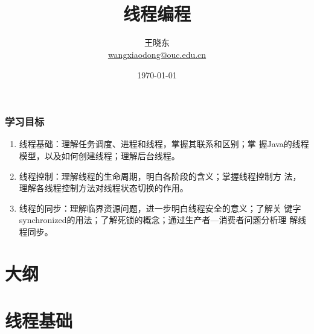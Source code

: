 
\title[KevinW@OUC]{\\  
  线程编程}
\author[王晓东]{王晓东\\
  \href{mailto:wangxiaodong@ouc.edu.cn}{\footnotesize wangxiaodong@ouc.edu.cn}}
\date{\today}


\frame{\titlepage}
\begin{frame}
  \frametitle{学习目标}
  \begin{enumerate}
  \item 线程基础：理解任务调度、进程和线程，掌握其联系和区别；掌
    握Java的线程模型，以及如何创建线程；理解后台线程。
  \item 线程控制：理解线程的生命周期，明白各阶段的含义；掌握线程控制方
    法，理解各线程控制方法对线程状态切换的作用。
  \item 线程的同步：理解临界资源问题，进一步明白线程安全的意义；了解关
    键字synchronized的用法；了解死锁的概念；通过生产者—消费者问题分析理
    解线程同步。
  \end{enumerate}  
\end{frame}

\section*{大纲}

\section{线程基础}

